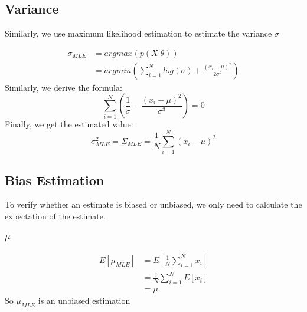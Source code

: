 \documentclass{report}
\begin{document}
\subsection{Variance}
Similarly, we use maximum likelihood estimation to estimate the variance 
$\sigma $

$$
\begin{aligned}
\sigma_{MLE}
&=argmax(p(X|\theta))\\
&=argmin(\sum_{i=1}^N log(\sigma)+\frac{(x_i-\mu)^2}{2\sigma^2})
\end{aligned}
$$
Similarly, we derive the formula:
$$
\sum_{i=1}^N(\frac{1}{\sigma}-\frac{(x_i-\mu)^2}{\sigma^3})=0
$$
Finally, we get the estimated value:
$$
\sigma_{MLE}^2 = \Sigma_{MLE} = \frac{1}{N} \sum_{i=1}^N (x_i-\mu)^2
$$
\subsection{Bias Estimation}
To verify whether an estimate is biased or unbiased, we only need to calculate the expectation of the estimate.
\subsubsection{$\mu$}
$$
\begin{aligned}
E[\mu_{MLE}]
&=E[\frac{1}{N}\sum_{i=1}^N x_i]\\
&=\frac{1}{N}\sum_{i=1}^N E[x_i]\\
&=\mu
\end{aligned}
$$
So $\mu_{MLE}$ is an unbiased estimation
\end{document}
